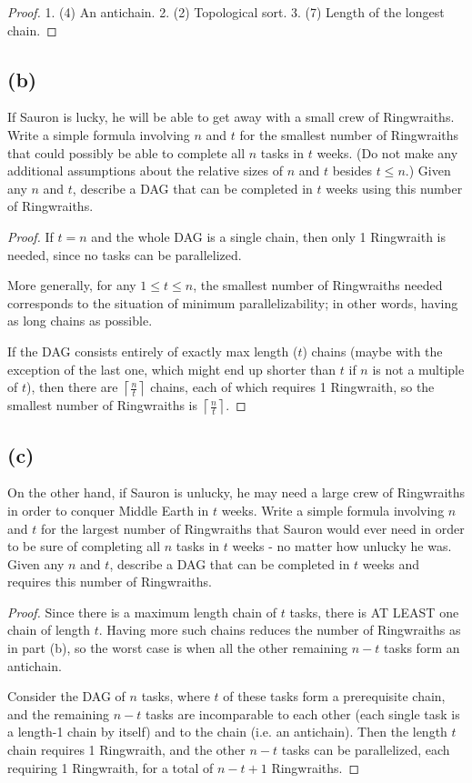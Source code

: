 \documentclass[14pt]{extarticle}
\begin{document}
\begin{proof}
1. (4) An antichain. 2. (2) Topological sort. 3. (7) Length of the longest chain.
\end{proof}

\subsection{(b)}
If Sauron is lucky, he will be able to get away with a small crew of Ringwraiths. Write a simple formula involving $n$ and $t$ for the smallest number of Ringwraiths that could possibly be able to complete all $n$ tasks in $t$ weeks. (Do not make any additional assumptions about the relative sizes of $n$ and $t$ besides $t \leq n$.) Given any $n$ and $t$, describe a DAG that can be completed in $t$ weeks using this number of Ringwraiths.
\begin{proof}
If $t = n$ and the whole DAG is a single chain, then only 1 Ringwraith is needed, since no tasks can be parallelized.

More generally, for any $1 \leq t \leq n$, the smallest number of Ringwraiths needed corresponds to the situation of minimum parallelizability; in other words, having as long chains as possible.

If the DAG consists entirely of exactly max length ($t$) chains (maybe with the exception of the last one, which might end up shorter than $t$ if $n$ is not a multiple of $t$), then there are $\displaystyle\left\lceil \frac{n}{t} \right\rceil$ chains, each of which requires 1 Ringwraith, so the smallest number of Ringwraiths is $\displaystyle\left\lceil \frac{n}{t} \right\rceil$.
\end{proof}

\subsection{(c)}
On the other hand, if Sauron is unlucky, he may need a large crew of Ringwraiths in order to conquer Middle Earth in $t$ weeks. Write a simple formula involving $n$ and $t$ for the largest number of Ringwraiths that Sauron would ever need in order to be sure of completing all $n$ tasks in $t$ weeks - no matter how unlucky he was. Given any $n$ and $t$, describe a DAG that can be completed in $t$ weeks and requires this number of Ringwraiths.
\begin{proof}
Since there is a maximum length chain of $t$ tasks, there is AT LEAST one chain of length $t$. Having more such chains reduces the number of Ringwraiths as in part (b), so the worst case is when all the other remaining $n-t$ tasks form an antichain.

Consider the DAG of $n$ tasks, where $t$ of these tasks form a prerequisite chain, and the remaining $n-t$ tasks are incomparable to each other (each single task is a length-1 chain by itself) and to the chain (i.e. an antichain). Then the length $t$ chain requires 1 Ringwraith, and the other $n-t$ tasks can be parallelized, each requiring 1 Ringwraith, for a total of $n-t+1$ Ringwraiths.
\end{proof}
\end{document}
